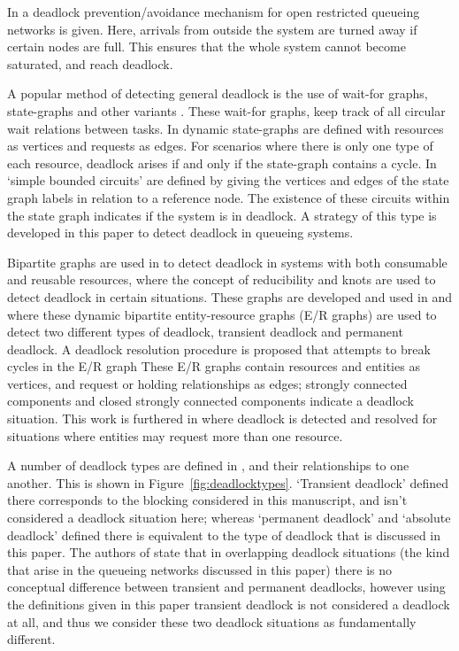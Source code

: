 \documentclass{article}
\numberwithin{equation}{section}
\begin{document}
In \cite{schmidtjackman00} a deadlock prevention/avoidance mechanism for open
restricted queueing networks is given.
Here, arrivals from outside the system are turned away if certain nodes are
full.
This ensures that the whole system cannot become saturated, and reach deadlock.

A popular method of detecting general deadlock is the use of wait-for graphs,
state-graphs and other variants \cite{cheng90, elmagarmid86, coffmanelphick71,
choetal95, deuermeyeretal97, venkateshetal98, venkateshsmith03,
venkateshsmith05, holt72}.
These wait-for graphs, keep track of all circular wait relations between tasks.
In \cite{coffmanelphick71} dynamic state-graphs are defined with resources as
vertices and requests as edges.
For scenarios where there is only one type of each resource, deadlock arises
if and only if the state-graph contains a cycle.
In \cite{choetal95} `simple bounded circuits' are defined by giving the
vertices and edges of the state graph labels in relation to a reference node.
The existence of these circuits within the state graph indicates if the system
is in deadlock.
A strategy of this type is developed in this paper to detect deadlock in
queueing systems.

Bipartite graphs are used in \cite{holt72} to detect deadlock in systems with
both consumable and reusable resources, where the concept of reducibility and
knots are used to detect deadlock in certain situations.
These graphs are developed and used in \cite{deuermeyeretal97} and
\cite{venkateshsmith03} where these dynamic bipartite entity-resource graphs
(E/R graphs) are used to detect two different types of deadlock, transient
deadlock and permanent deadlock. A deadlock resolution procedure is proposed
that attempts to break cycles in the E/R graph
These E/R graphs contain resources and entities as vertices, and request or
holding relationships as edges; strongly connected components and closed
strongly connected components indicate a deadlock situation.
This work is furthered in \cite{venkateshetal98} where deadlock is detected
and resolved for situations where entities may request more than one resource.

A number of deadlock types are defined in \cite{venkateshetal98}, and their
relationships to one another.
This is shown in Figure~\ref{fig:deadlocktypes}.
`Transient deadlock' defined there corresponds to the blocking considered in
this manuscript, and isn't considered a deadlock situation here; whereas
`permanent deadlock' and `absolute deadlock' defined there is equivalent to
the type of deadlock that is discussed in this paper.
The authors of \cite{venkateshetal98} state that in overlapping deadlock
situations (the kind that arise in the queueing networks discussed in this
paper) there is no conceptual difference between transient and permanent
deadlocks, however using the definitions given in this paper transient
deadlock is not considered a deadlock at all, and thus we consider these two
deadlock situations as fundamentally different.
\end{document}
